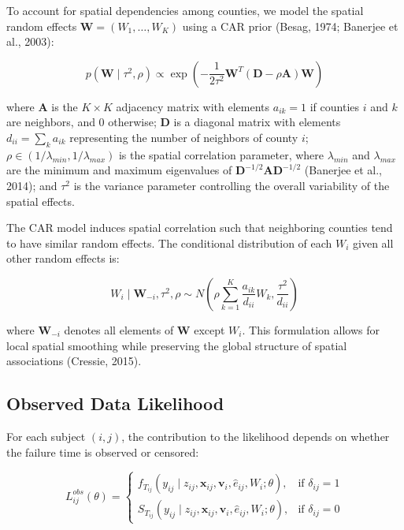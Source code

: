\documentclass[useAMS,referee]{biom}
\begin{document}
To account for spatial dependencies among counties, we model the spatial random effects $\mathbf{W} = (W_1, \ldots, W_K)$ using a CAR prior (Besag, 1974; Banerjee et al., 2003):

\begin{equation}
p(\mathbf{W} \mid \tau^2, \rho) \propto \exp\left(-\frac{1}{2\tau^2} \mathbf{W}^T (\mathbf{D} - \rho \mathbf{A}) \mathbf{W}\right)
\end{equation}

where $\mathbf{A}$ is the $K \times K$ adjacency matrix with elements $a_{ik} = 1$ if counties $i$ and $k$ are neighbors, and 0 otherwise; $\mathbf{D}$ is a diagonal matrix with elements $d_{ii} = \sum_k a_{ik}$ representing the number of neighbors of county $i$; $\rho \in (1/\lambda_{min}, 1/\lambda_{max})$ is the spatial correlation parameter, where $\lambda_{min}$ and $\lambda_{max}$ are the minimum and maximum eigenvalues of $\mathbf{D}^{-1/2}\mathbf{A}\mathbf{D}^{-1/2}$ (Banerjee et al., 2014); and $\tau^2$ is the variance parameter controlling the overall variability of the spatial effects.

The CAR model induces spatial correlation such that neighboring counties tend to have similar random effects. The conditional distribution of each $W_i$ given all other random effects is:

\begin{equation}
W_i \mid \mathbf{W}_{-i}, \tau^2, \rho \sim N\left(\rho \sum_{k=1}^K \frac{a_{ik}}{d_{ii}} W_k, \frac{\tau^2}{d_{ii}}\right)
\end{equation}

where $\mathbf{W}_{-i}$ denotes all elements of $\mathbf{W}$ except $W_i$. This formulation allows for local spatial smoothing while preserving the global structure of spatial associations (Cressie, 2015).

\subsection{Observed Data Likelihood}

For each subject $(i,j)$, the contribution to the likelihood depends on whether the failure time is observed or censored:

\begin{equation}
L_{ij}^{obs}(\theta) = \begin{cases}
f_{T_{ij}}(y_{ij} \mid z_{ij}, \mathbf{x}_{ij}, \mathbf{v}_i, \hat{e}_{ij}, W_i; \theta), & \text{if } \delta_{ij} = 1 \\
S_{T_{ij}}(y_{ij} \mid z_{ij}, \mathbf{x}_{ij}, \mathbf{v}_i, \hat{e}_{ij}, W_i; \theta), & \text{if } \delta_{ij} = 0
\end{cases}
\end{equation}
\end{document}
